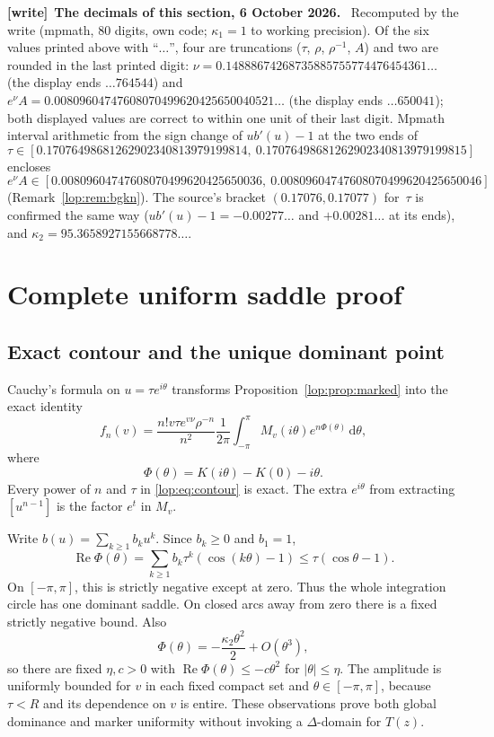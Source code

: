 \documentclass[11pt,letterpaper]{article}
\numberwithin{equation}{section}
\theoremstyle{remark}\newtheorem{remark}[theorem]{Remark}
\newcommand{\dd}{\,\mathrm d}
\newcommand{\Rea}{\operatorname{Re}}
\newenvironment{writenote}[1][]{\par\smallskip\begingroup\small
 \noindent\textbf{[write]}\if\relax\detokenize{#1}\relax\else~\textbf{#1.}\fi\ }%
 {\par\endgroup\smallskip}
\begin{document}
\begin{writenote}[The decimals of this section, 6 October 2026]
Recomputed by the write (mpmath, 80 digits, own code; $\kappa_1=1$ to
working precision). Of the six values printed above with ``$\ldots$'', four
are truncations ($\tau$, $\rho$, $\rho^{-1}$, $A$) and two are rounded in the
last printed digit: $\nu=0.14888674268735885755774476454361\ldots$ (the
display ends $\ldots764544$) and
$e^\nu A=0.00809604747608070499620425650040521\ldots$ (the display ends
$\ldots650041$); both displayed values are correct to within one unit of
their last digit. Mpmath interval arithmetic from the sign change of
$ub'(u)-1$ at the two ends of
\[\tau\in[0.17076498681262902340813979199814,\ 0.17076498681262902340813979199815]\]
encloses
\[e^\nu A\in[0.00809604747608070499620425650036,\ 0.00809604747608070499620425650046]\]
(Remark~\ref{lop:rem:bgkn}). The source's bracket $(0.17076,0.17077)$
for~$\tau$ is confirmed the same way ($ub'(u)-1=-0.00277\ldots$ and
$+0.00281\ldots$ at its ends), and $\kappa_2=95.3658927155668778\ldots$.
\end{writenote}

\section{Complete uniform saddle proof}\label{lop:sec:proof}

\subsection{Exact contour and the unique dominant point}
Cauchy's formula on $u=\tau e^{i\theta}$ transforms
Proposition~\ref{lop:prop:marked} into the exact identity
\begin{equation}\label{lop:eq:contour}
 f_n(v)=\frac{n!v\tau e^{v\nu}\rho^{-n}}{n^2}
 \frac1{2\pi}\int_{-\pi}^{\pi}M_v(i\theta)e^{n\Phi(\theta)}\dd\theta,
\end{equation}
where
\[
 \Phi(\theta)=K(i\theta)-K(0)-i\theta.
\]
Every power of $n$ and $\tau$ in \eqref{lop:eq:contour} is exact. The extra
$e^{i\theta}$ from extracting $[u^{n-1}]$ is the factor $e^t$ in $M_v$.

Write $b(u)=\sum_{k\geq1}b_ku^k$. Since $b_k\geq0$ and $b_1=1$,
\begin{equation}\label{lop:eq:global}
 \Rea\Phi(\theta)
 =\sum_{k\geq1}b_k\tau^k(\cos(k\theta)-1)
 \leq\tau(\cos\theta-1).
\end{equation}
On $[-\pi,\pi]$, this is strictly negative except at zero. Thus the
whole integration circle has one dominant saddle. On closed arcs
away from zero there is a fixed strictly negative bound.
Also
\[
 \Phi(\theta)=-\frac{\kappa_2\theta^2}{2}+O(\theta^3),
\]
so there are fixed $\eta,c>0$ with
$\Rea\Phi(\theta)\leq-c\theta^2$ for $|\theta|\leq\eta$.
The amplitude is uniformly bounded for $v$ in each fixed compact set
and $\theta\in[-\pi,\pi]$, because $\tau<R$ and its dependence on $v$
is entire. These observations prove both global dominance and marker
uniformity without invoking a $\Delta$-domain for $T(z)$.
\end{document}

